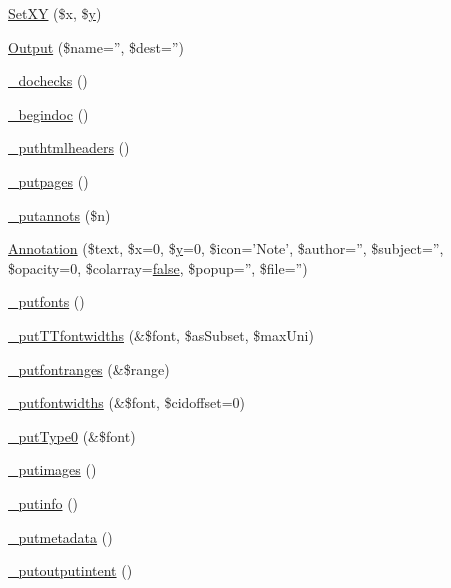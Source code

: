 \begin{DoxyCompactItemize}
\item 
\hyperlink{classm_p_d_f_a3027b868c8f2424d2edc5e827e389b46}{Set\-X\-Y} (\$x, \$\hyperlink{example43___m_p_d_f_i__booklet_8php_a3f83be162d14f38451e1bc419fbbbcbc}{y})
\item 
\hyperlink{classm_p_d_f_ad65362df0f40adaf5a8e2ab4a2b5be08}{Output} (\$name='', \$dest='')
\item 
\hyperlink{classm_p_d_f_aac787f364934790bf0b4b9478f35bc8f}{\-\_\-dochecks} ()
\item 
\hyperlink{classm_p_d_f_aeb4df7dc6e537b29e7a475a63a8e0c16}{\-\_\-begindoc} ()
\item 
\hyperlink{classm_p_d_f_a2e2d5e5f065464a658dcee6dc7c89372}{\-\_\-puthtmlheaders} ()
\item 
\hyperlink{classm_p_d_f_ae25fd6af545e513767ca5bfe7ca8af41}{\-\_\-putpages} ()
\item 
\hyperlink{classm_p_d_f_acd42855a47847fd169621b0e5303a97a}{\-\_\-putannots} (\$n)
\item 
\hyperlink{classm_p_d_f_a31a33990355a54de4cea3665592e4952}{Annotation} (\$text, \$x=0, \$\hyperlink{example43___m_p_d_f_i__booklet_8php_a3f83be162d14f38451e1bc419fbbbcbc}{y}=0, \$icon='Note', \$author='', \$subject='', \$opacity=0, \$colarray=\hyperlink{ttfontsuni_8php_afbaa04e5cc97693dc668b3c45d3dd740}{false}, \$popup='', \$file='')
\item 
\hyperlink{classm_p_d_f_abc862900d0692ae1d96c31d68799d44a}{\-\_\-putfonts} ()
\item 
\hyperlink{classm_p_d_f_ab89f7aae32aefd249c9238333e53e20f}{\-\_\-put\-T\-Tfontwidths} (\&\$font, \$as\-Subset, \$max\-Uni)
\item 
\hyperlink{classm_p_d_f_ab5cd3c6aae71721b7f9ce78b65bc561a}{\-\_\-putfontranges} (\&\$range)
\item 
\hyperlink{classm_p_d_f_a732319bf9d5f90da91602d3410bcac43}{\-\_\-putfontwidths} (\&\$font, \$cidoffset=0)
\item 
\hyperlink{classm_p_d_f_a7b6b10972c41ad1b39834a64e6993bb4}{\-\_\-put\-Type0} (\&\$font)
\item 
\hyperlink{classm_p_d_f_a805e585f76d883ac4c12d2d0d3a2c800}{\-\_\-putimages} ()
\item 
\hyperlink{classm_p_d_f_a9172bec7b80e537025b137b28080a003}{\-\_\-putinfo} ()
\item 
\hyperlink{classm_p_d_f_ac1478a44e31115ace13c4ba7158810f0}{\-\_\-putmetadata} ()
\item 
\hyperlink{classm_p_d_f_a0de37ff05eba2f5720c574453c611c26}{\-\_\-putoutputintent} ()
\item 

\end{DoxyCompactItemize}
